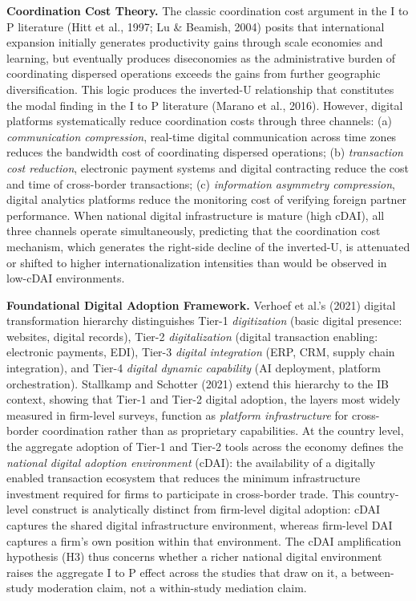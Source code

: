 \documentclass[
  12pt,a4paper]{article}
\begin{document}
\textbf{Coordination Cost Theory.} The classic coordination cost
argument in the I to P literature (Hitt et al., 1997; Lu \& Beamish,
2004) posits that international expansion initially generates
productivity gains through scale economies and learning, but eventually
produces diseconomies as the administrative burden of coordinating
dispersed operations exceeds the gains from further geographic
diversification. This logic produces the inverted-U relationship that
constitutes the modal finding in the I to P literature (Marano et al.,
2016). However, digital platforms systematically reduce coordination
costs through three channels: (a) \emph{communication compression},
real-time digital communication across time zones reduces the bandwidth
cost of coordinating dispersed operations; (b) \emph{transaction cost
reduction}, electronic payment systems and digital contracting reduce
the cost and time of cross-border transactions; (c) \emph{information
asymmetry compression}, digital analytics platforms reduce the
monitoring cost of verifying foreign partner performance. When national
digital infrastructure is mature (high cDAI), all three channels operate
simultaneously, predicting that the coordination cost mechanism, which
generates the right-side decline of the inverted-U, is attenuated or
shifted to higher internationalization intensities than would be
observed in low-cDAI environments.

\textbf{Foundational Digital Adoption Framework.} Verhoef et al.'s
(2021) digital transformation hierarchy distinguishes Tier-1
\emph{digitization} (basic digital presence: websites, digital records),
Tier-2 \emph{digitalization} (digital transaction enabling: electronic
payments, EDI), Tier-3 \emph{digital integration} (ERP, CRM, supply
chain integration), and Tier-4 \emph{digital dynamic capability} (AI
deployment, platform orchestration). Stallkamp and Schotter (2021)
extend this hierarchy to the IB context, showing that Tier-1 and Tier-2
digital adoption, the layers most widely measured in firm-level surveys,
function as \emph{platform infrastructure} for cross-border coordination
rather than as proprietary capabilities. At the country level, the
aggregate adoption of Tier-1 and Tier-2 tools across the economy defines
the \emph{national digital adoption environment} (cDAI): the
availability of a digitally enabled transaction ecosystem that reduces
the minimum infrastructure investment required for firms to participate
in cross-border trade. This country-level construct is analytically
distinct from firm-level digital adoption: cDAI captures the shared
digital infrastructure environment, whereas firm-level DAI captures a
firm's own position within that environment. The cDAI amplification
hypothesis (H3) thus concerns whether a richer national digital
environment raises the aggregate I to P effect across the studies that
draw on it, a between-study moderation claim, not a within-study
mediation claim.
\end{document}
